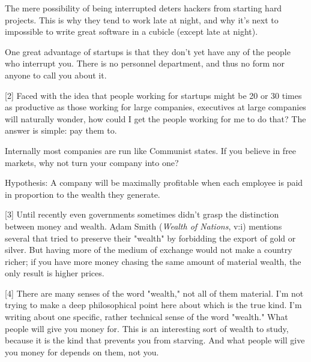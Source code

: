 The mere possibility of being
                    interrupted deters hackers from starting hard projects. This
                    is why they tend to work late at night, and why it's next to
                    impossible to write great software in a cubicle (except late
                    at night).

One great advantage of startups is
                    that they don't yet have any of the people who interrupt
                    you. There is no personnel department, and thus no form nor
                    anyone to call you about it.

[2] Faced with the idea that people working for startups
                    might be 20 or 30 times as productive as those working for
                    large companies, executives at large companies will
                    naturally wonder, how could I get the people working for me
                    to do that? The answer is simple: pay them to.

Internally
                    most companies are run like Communist states. If you believe
                    in free markets, why not turn your company into one?

Hypothesis:
                    A company will be maximally profitable when each employee is
                    paid in proportion to the wealth they generate.

[3] Until recently even governments sometimes didn't grasp
                    the distinction between money and wealth. Adam Smith (\emph{Wealth of Nations}, v:i) mentions several that tried to preserve their
                    "wealth" by forbidding the export of gold or silver. But
                    having more of the medium of exchange would not make a
                    country richer; if you have more money chasing the same
                    amount of material wealth, the only result is higher
                    prices.

[4] There are many senses of the word "wealth," not all of
                    them material. I'm not trying to make a deep philosophical
                    point here about which is the true kind. I'm writing about
                    one specific, rather technical sense of the word "wealth."
                    What people will give you money for. This is an interesting
                    sort of wealth to study, because it is the kind that
                    prevents you from starving. And what people will give you
                    money for depends on them, not you.

